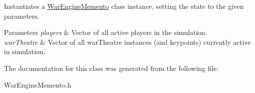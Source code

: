 Instantiates a \hyperlink{classWarEngineMemento}{War\+Engine\+Memento} class instance, setting the state to the given parameters. 


\begin{DoxyParams}{Parameters}
{\em players} & Vector of all active players in the simulation. \\
\hline
{\em war\+Theatre} & Vector of all war\+Theatre instances (and keypoints) currently active in simulation. \\
\hline
\end{DoxyParams}


The documentation for this class was generated from the following file\+:\begin{DoxyCompactItemize}
\item 
War\+Engine\+Memento.\+h\end{DoxyCompactItemize}
